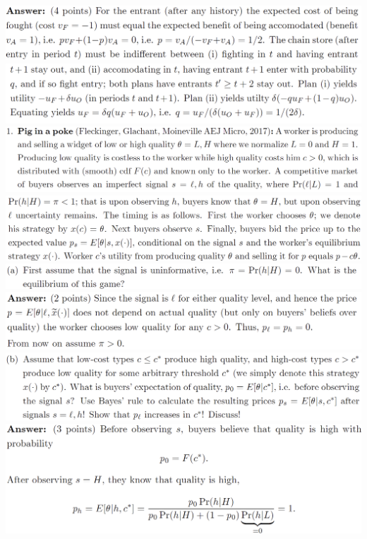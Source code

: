 \documentclass[8pt,landscape]{extarticle}
\begin{document}
\begin{multicols*}{3}
    \includegraphics[width=0.9\linewidth,keepaspectratio]{Screenshots/Screenshot 2024-03-15 093955.png}
    \includegraphics[width=0.91\linewidth,keepaspectratio]{Screenshots/Screenshot 2024-03-15 094000.png}
    \includegraphics[width=0.98\linewidth,keepaspectratio]{Screenshots/Screenshot 2024-03-15 094009.png}
    \includegraphics[width=0.95\linewidth,keepaspectratio]{Screenshots/Screenshot 2024-03-15 094014.png}
    \includegraphics[width=0.95\linewidth,keepaspectratio]{Screenshots/Screenshot 2024-03-15 094019.png}
    \includegraphics[width=0.9\linewidth,keepaspectratio]{Screenshots/Screenshot 2024-03-15 094024.png}
    \includegraphics[width=0.94\linewidth,keepaspectratio]{Screenshots/Screenshot 2024-03-15 094029.png}
    \includegraphics[width=0.89\linewidth,keepaspectratio]{Screenshots/Screenshot 2024-03-15 094036.png}

\end{multicols*}
\end{document}
